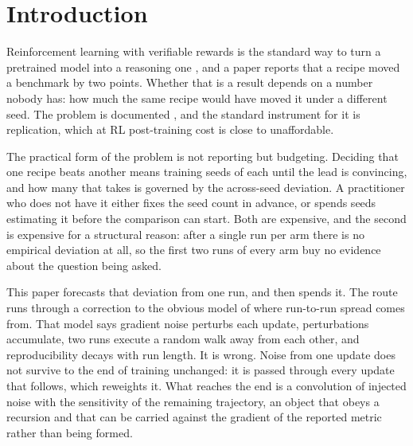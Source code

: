 \section{Introduction}
\label{sec:introduction}

Reinforcement learning with verifiable rewards is the standard way to turn a pretrained model into
a reasoning one \citep{deepseekr1}, and a paper reports that a recipe moved a benchmark by two
points. Whether that is a result depends on a number nobody has: how much the same recipe would
have moved it under a different seed. The problem is documented
\citep{henderson2018matters, hochlehnert2025sober}, and the standard instrument for it is
replication, which at RL post-training cost is close to unaffordable.

The practical form of the problem is not reporting but budgeting. Deciding that one recipe beats
another means training seeds of each until the lead is convincing, and how many that takes is
governed by the across-seed deviation. A practitioner who does not have it either fixes the seed
count in advance, or spends seeds estimating it before the comparison can start. Both are
expensive, and the second is expensive for a structural reason: after a single run per arm there is
no empirical deviation at all, so the first two runs of every arm buy no evidence about the
question being asked.

This paper forecasts that deviation from one run, and then spends it. The route runs through a
correction to the obvious model of where run-to-run spread comes from. That model says gradient
noise perturbs each update, perturbations accumulate, two runs execute a random walk away from each
other, and reproducibility decays with run length. It is wrong. Noise from one update does not
survive to the end of training unchanged: it is passed through every update that follows, which
reweights it. What reaches the end is a convolution of injected noise with the sensitivity of the
remaining trajectory, an object that obeys a recursion and that can be carried against the gradient
of the reported metric rather than being formed.

